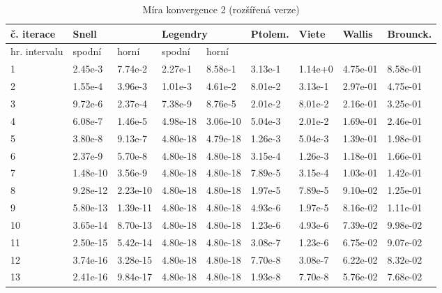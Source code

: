 \documentclass[soc]{gzwroc} %
\begin{document}
\begin{table}[h!]
\caption{Míra konvergence 2 (rozšířená verze)}
\begin{tabular}{|l|l|l|l|l|l|l|l|l|}
\hline
\multicolumn{1}{|l|}{\bfseries č. iterace} & \multicolumn{2}{l|}{\bfseries Snell} & \multicolumn{2}{l|}{\bfseries Legendry} & \multicolumn{1}{l|}{\bfseries Ptolem.} & \multicolumn{1}{l|}{\bfseries Viete} & \multicolumn{1}{l|}{\bfseries Wallis} & \multicolumn{1}{l|}{\bfseries Brounck.}  \\ \hline
\multicolumn{1}{|l|}{hr. intervalu} & \multicolumn{1}{l|}{spodní} & \multicolumn{1}{l|}{horní} & \multicolumn{1}{l|}{spodní} & \multicolumn{1}{l|}{horní} & \multicolumn{1}{l|}{} & \multicolumn{1}{l|}{} & \multicolumn{1}{l|}{} & \multicolumn{1}{l|}{} \\ \hline \hline
1 & 2.45e-3 & 7.74e-2 & 2.27e-1 & 8.58e-1 & 3.13e-1 & 1.14e+0 & 4.75e-01 & 8.58e-01 \\ \hline 
2 & 1.55e-4 & 3.96e-3 & 1.01e-3 & 4.61e-2 & 8.01e-2 & 3.13e-1 & 2.97e-01 & 4.75e-01 \\ \hline 
3 & 9.72e-6 & 2.37e-4 & 7.38e-9 & 8.76e-5 & 2.01e-2 & 8.01e-2 & 2.16e-01 & 3.25e-01 \\ \hline 
4 & 6.08e-7 & 1.46e-5 & 4.98e-18 & 3.06e-10 & 5.04e-3 & 2.01e-2 & 1.69e-01 & 2.46e-01 \\ \hline 
5 & 3.80e-8 & 9.13e-7 & 4.80e-18 & 4.79e-18 & 1.26e-3 & 5.04e-3 & 1.39e-01 & 1.98e-01 \\ \hline 
6 & 2.37e-9 & 5.70e-8 & 4.80e-18 & 4.80e-18 & 3.15e-4 & 1.26e-3 & 1.18e-01 & 1.66e-01 \\ \hline 
7 & 1.48e-10 & 3.56e-9 & 4.80e-18 & 4.80e-18 & 7.89e-5 & 3.15e-4 & 1.03e-01 & 1.42e-01 \\ \hline 
8 & 9.28e-12 & 2.23e-10 & 4.80e-18 & 4.80e-18 & 1.97e-5 & 7.89e-5 & 9.10e-02 & 1.25e-01 \\ \hline 
9 & 5.80e-13 & 1.39e-11 & 4.80e-18 & 4.80e-18 & 4.93e-6 & 1.97e-5 & 8.16e-02 & 1.11e-01 \\ \hline 
10 & 3.65e-14 & 8.70e-13 & 4.80e-18 & 4.80e-18 & 1.23e-6 & 4.93e-6 & 7.39e-02 & 9.98e-02 \\ \hline 
11 & 2.50e-15 & 5.42e-14 & 4.80e-18 & 4.80e-18 & 3.08e-7 & 1.23e-6 & 6.75e-02 & 9.07e-02 \\ \hline 
12 & 3.74e-16 & 3.28e-15 & 4.80e-18 & 4.80e-18 & 7.70e-8 & 3.08e-7 & 6.22e-02 & 8.32e-02 \\ \hline 
13 & 2.41e-16 & 9.84e-17 & 4.80e-18 & 4.80e-18 & 1.93e-8 & 7.70e-8 & 5.76e-02 & 7.68e-02 \\ \hline 

\end{tabular}
\end{table}
\end{document}

